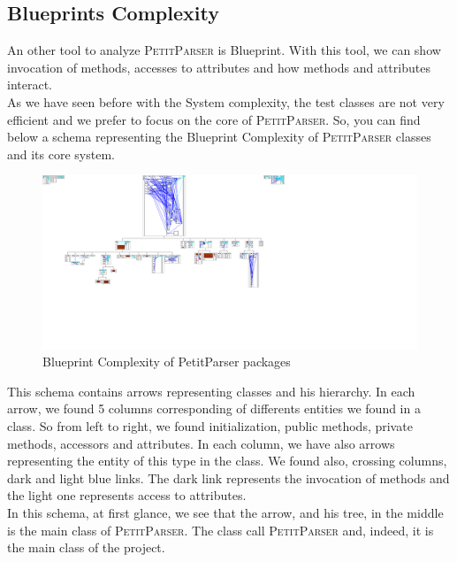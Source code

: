 \subsection{Blueprints Complexity}
An other tool to analyze \textsc{PetitParser} is Blueprint.  With this tool, we can show invocation of methods, accesses to attributes and how methods and attributes interact.\\
As we have seen before with the System complexity, the test classes are not very efficient and we prefer to focus on the core of \textsc{PetitParser}.  So, you can find below a schema representing the Blueprint Complexity of \textsc{PetitParser} classes and its core system.\\
\begin{figure}[ht]
\label{blueprint_system}
\includegraphics[scale=0.35]{blueprint_petit_parser.png}
\caption{Blueprint Complexity of PetitParser packages}
\end{figure}
This schema contains arrows representing classes and his hierarchy.  In each arrow, we found 5 columns corresponding of differents entities we found in a class.  So from left to right, we found initialization, public methods, private methods, accessors and attributes.  In each column, we have also arrows representing the entity of this type in the class.  We found also, crossing columns, dark and light blue links.  The dark link represents the invocation of methods and the light one represents access to attributes.\\

In this schema, at first glance, we see that the arrow, and his tree, in the middle is the main class of \textsc{PetitParser}.  The class call \textsc{PetitParser} and, indeed, it is the main class of the project. \\


